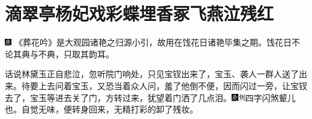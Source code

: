 
\chapter{滴翠亭杨妃戏彩蝶\hspace{.5em}埋香冢飞燕泣残红}

{\includegraphics[width=3mm]{../Images/00004} \kaishu 《葬花吟》是大观园诸艳之归源小引，故用在饯花日诸艳毕集之期。饯花日不论其典与不典，只取其韵耳。}

话说林黛玉正自悲泣，忽听院门响处，只见宝钗出来了，宝玉、袭人一群人送了出来。待要上去问着宝玉，又恐当着众人问，羞了他倒不便，因而闪过一旁，让宝钗去了，宝玉等进去关了门，方转过来，犹望着门洒了几点泪。{\includegraphics[width=3mm]{../Images/00004}\includegraphics[width=3mm]{../Images/00011}\footnotesize \kaishu 四字闪煞颦儿也。}自觉无味，便转身回来，无精打彩的卸了残妆。

